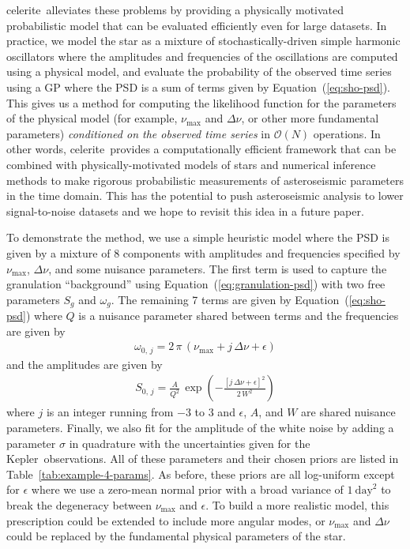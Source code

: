 \documentclass[manuscript, letterpaper]{aastex6}
\newcommand{\project}[1]{\textsf{#1}}
\newcommand{\kepler}{\project{Kepler}}
\newcommand{\celerite}{\project{celerite}}
\renewcommand{\eqref}[1]{\ref{eq:#1}}
\newcommand{\Eq}[1]{Equation~(\eqref{#1})}
\newcommand{\eq}[1]{\Eq{#1}}
\newcommand{\response}[1]{{#1}}
\begin{document}
\celerite\ alleviates these problems by providing a physically motivated
probabilistic model that can be evaluated efficiently even for large datasets.
In practice, we model the star as a mixture of stochastically-driven simple
harmonic oscillators where the amplitudes and frequencies of the oscillations
are computed using a physical model, and evaluate the probability of the
observed time series using a GP where the PSD is a sum of terms given by
\eq{sho-psd}.
This gives us a method for computing the likelihood function for the
parameters of the physical model (for example, $\nu_\mathrm{max}$ and $\Delta
    \nu$, or other more fundamental parameters) \emph{conditioned on the observed
    time series} in $\mathcal{O}(N)$ operations.
In other words, \celerite\ provides a computationally efficient framework that
can be combined with physically-motivated models of stars and numerical
inference methods to make rigorous probabilistic measurements of asteroseismic
parameters in the time domain.
This has the potential to push asteroseismic analysis to lower signal-to-noise
datasets and we hope to revisit this idea in a future paper.

To demonstrate the method, we use a simple heuristic model where the PSD is
given by a mixture of 8 components with amplitudes and frequencies specified
by $\nu_\mathrm{max}$, $\Delta \nu$, and some nuisance parameters.
The first term is used to capture the granulation ``background''
\citep{Kallinger:2014} using \eq{granulation-psd} with two free parameters
$S_g$ and $\omega_g$.
The remaining  7 terms are given by \eq{sho-psd} where $Q$ is a nuisance
parameter shared between terms and the frequencies are given by
\begin{eqnarray}
    \omega_{0,\,j} = 2\,\pi\,(\nu_\mathrm{max} + j\,\Delta\nu + \epsilon)
\end{eqnarray}
and the amplitudes are given by
\begin{eqnarray}
    S_{0,\,j} =
    \frac{A}{Q^2}\,\exp\left(-\frac{[j\,\Delta\nu + \epsilon]^2}{2\,W^2}\right)
\end{eqnarray}
where $j$ is an integer running from $-3$ to 3 and $\epsilon$, $A$, and $W$
are shared nuisance parameters.
\response{Finally, we also fit for the amplitude of the white noise by adding
    a parameter $\sigma$ in quadrature with the uncertainties given for the
    \kepler\ observations.
    All of these parameters and their chosen priors are listed in
    Table~\ref{tab:example-4-params}.
    As before, these priors are all log-uniform except for $\epsilon$ where we use
    a zero-mean normal prior with a broad variance of $1~\mathrm{day}^2$ to break
    the degeneracy between $\nu_\mathrm{max}$ and $\epsilon$.
}
To build a more realistic model, this prescription could be extended to
include more angular modes, or $\nu_\mathrm{max}$ and $\Delta \nu$ could be
replaced by the fundamental physical parameters of the star.
\end{document}

